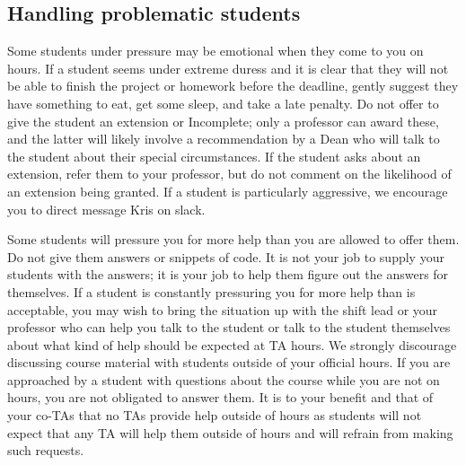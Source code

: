 \documentclass[a4paper]{article}
\begin{document}
\subsection{Handling problematic students}
Some students under pressure may be emotional when they come to you on hours. If a student seems under extreme duress and it is clear that they will not be able to finish the  project or homework before the deadline, gently suggest they have something to eat, get some sleep, and take a late penalty. Do not offer to give the student an extension or Incomplete; only a professor can award these, and the latter will likely involve a
recommendation by a Dean who will talk to the student about their special circumstances. If
the student asks about an extension, refer them to your professor, but do not comment on
the likelihood of an extension being granted. If a student is particularly aggressive, we
encourage you to direct message Kris on slack.
\begin{flushleft}
Some students will pressure you for more help than you are allowed to offer them. Do not
give them answers or snippets of code. It is not your job to supply your students with the
answers; it is your job to help them figure out the answers for themselves. If a student is
constantly pressuring you for more help than is acceptable, you may wish to bring the
situation up with the shift lead or your professor who can help you talk to the student or talk to
the student themselves about what kind of help should be expected at TA hours.
We strongly discourage discussing course material with students outside of your official
hours. If you are approached by a student with questions about the course while you are not
on hours, you are not obligated to answer them. It is to your benefit and that of your co-TAs
that no TAs provide help outside of hours as students will not expect that any TA will help
them outside of hours and will refrain from making such requests. 
\end{flushleft}
\end{document}
